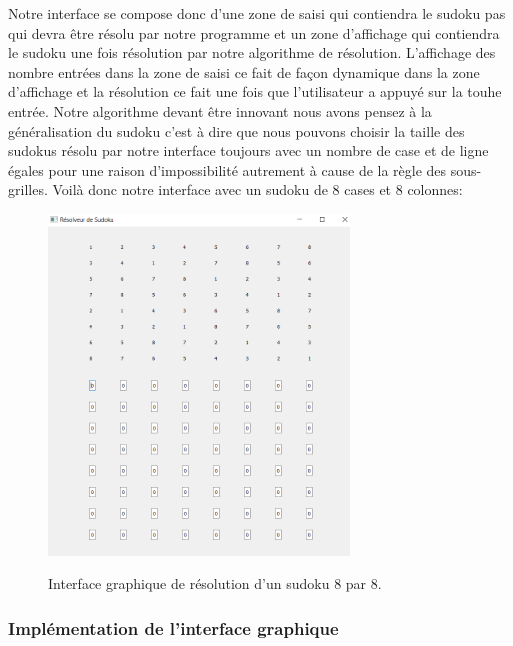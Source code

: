 Notre interface se compose donc d'une zone de saisi qui contiendra le sudoku pas qui devra être résolu par notre programme et un zone d'affichage qui contiendra le sudoku une fois résolution par notre algorithme de résolution. L'affichage des nombre entrées dans la zone de saisi ce fait de façon dynamique dans la zone d'affichage et la résolution ce fait une fois que l'utilisateur a appuyé sur la touhe entrée. Notre algorithme devant être innovant nous avons pensez à la généralisation du sudoku c'est à dire que nous pouvons choisir la taille des sudokus résolu par notre interface toujours avec un nombre de case et de ligne égales pour une raison d'impossibilité autrement à cause de la règle des sous-grilles.\newline
Voilà donc notre interface avec un sudoku de 8 cases et 8 colonnes:\newline

\begin{figure}[h]
  \begin{center}
\includegraphics[width=8cm]{./images/8_8.png}\label{Interface_affichage_8_8}
\caption{Interface graphique de résolution d'un sudoku 8 par 8.}
\end{center}
\end{figure}


\subsubsection{Implémentation de l'interface graphique}

